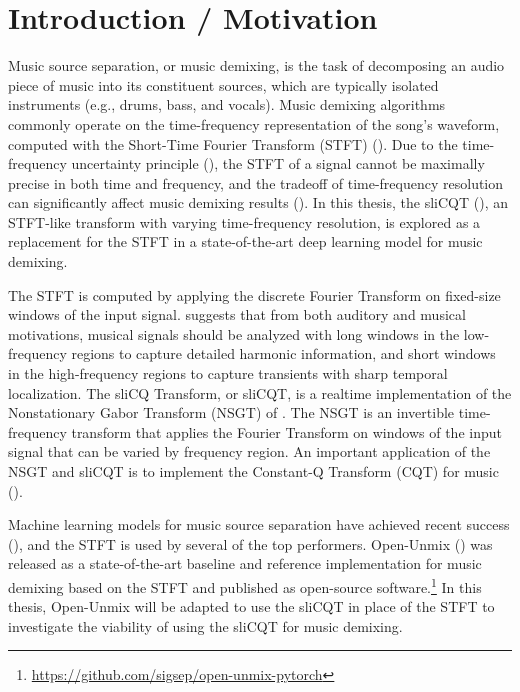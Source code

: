 \documentclass[letter,12pt]{article}
\title{\vspace{-2.25em}\ThesisTitle\vspace{-0.5em}}
\author{Sevag Hanssian}
\date{\vspace{-0.5em}October 17, 2021\vspace{-1.25em}}
\begin{document}
\maketitle

\section{Introduction / Motivation}

Music source separation, or music demixing, is the task of decomposing an audio piece of music into its constituent sources, which are typically isolated instruments (e.g., drums, bass, and vocals). Music demixing algorithms commonly operate on the time-frequency representation of the song's waveform, computed with the Short-Time Fourier Transform (STFT) (\cite{musicsepgood}). Due to the time-frequency uncertainty principle (\cite{gabor1946}), the STFT of a signal cannot be maximally precise in both time and frequency, and the tradeoff of time-frequency resolution can significantly affect music demixing results (\cite{tftradeoff1}). In this thesis, the sliCQT (\cite{slicq}), an STFT-like transform with varying time-frequency resolution, is explored as a replacement for the STFT in a state-of-the-art deep learning model for music demixing.

The STFT is computed by applying the discrete Fourier Transform on fixed-size windows of the input signal. \textcite{doerflerphd} suggests that from both auditory and musical motivations, musical signals should be analyzed with long windows in the low-frequency regions to capture detailed harmonic information, and short windows in the high-frequency regions to capture transients with sharp temporal localization. The sliCQ Transform, or sliCQT, is a realtime implementation of the Nonstationary Gabor Transform (NSGT) of \textcite{balazs}. The NSGT is an invertible time-frequency transform that applies the Fourier Transform on windows of the input signal that can be varied by frequency region. An important application of the NSGT and sliCQT is to implement the Constant-Q Transform (CQT) for music (\cite{jbrown}).

Machine learning models for music source separation have achieved recent success (\cite{sisec2018}), and the STFT is used by several of the top performers. Open-Unmix (\cite{umx}) was released as a state-of-the-art baseline and reference implementation for music demixing based on the STFT and published as open-source software.\footnote{\url{https://github.com/sigsep/open-unmix-pytorch}} In this thesis, Open-Unmix will be adapted to use the sliCQT in place of the STFT to investigate the viability of using the sliCQT for music demixing.
\end{document}

